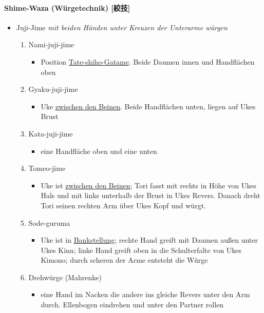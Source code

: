 \documentclass[justified, a4paper, notitlepage, captions=tableheading, nobib]{tufte-handout}
\begin{document}
\paragraph{Shime-Waza (Würgetechnik) [絞技] }
\label{sec:org27c08a4}
\begin{itemize}
\item Juji-Jime 
\emph{mit beiden Händen unter Kreuzen der Unterarme würgen}

\begin{enumerate}
\item Nami-juji-jime 
\begin{itemize}
\item Position \hyperref[org5efd028]{Tate-shiho-Gatame}. Beide Daumen innen und Handflächen oben
\end{itemize}
\item Gyaku-juji-jime 
\begin{itemize}
\item Uke \hyperref[orga527e99]{zwischen den Beinen}. Beide Handflächen unten, liegen auf Ukes Brust
\end{itemize}
\item Kata-juji-jime 
\begin{itemize}
\item eine Handfläche oben und eine unten
\end{itemize}
\item Tomeo-jime 
\begin{itemize}
\item Uke ist \hyperref[orga527e99]{zwischen den Beinen}; Tori fasst mit rechts in Höhe von Ukes Hals und mit links unterhalb der Brust in Ukes Revers. Danach dreht Tori seinen rechten Arm über Ukes Kopf und würgt.
\end{itemize}
\item Sode-guruma 
\begin{itemize}
\item Uke ist in \hyperref[orgf95c5ab]{Bankstellung}; rechte Hand greift mit Daumen außen unter Ukes Kinn; linke Hand greift oben in die Schulterfalte von Ukes Kimono; durch scheren der Arme entsteht die Würge
\end{itemize}
\item Drehwürge (Mahrenke) 
\begin{itemize}
\item eine Hand im Nacken die andere ins gleiche Revers unter den Arm durch. Ellenbogen eindrehen und unter den Partner rollen
\end{itemize}
\end{enumerate}


\end{itemize}
\end{document}
